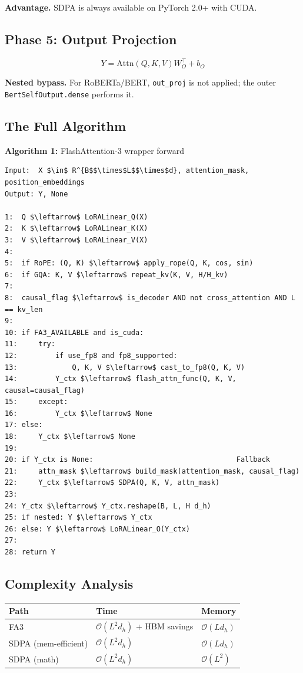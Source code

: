 \textbf{Advantage.} SDPA is always available on PyTorch 2.0+ with CUDA.

\subsection{Phase 5: Output Projection}

\[
Y = \text{Attn}(Q, K, V) W_O^\top + b_O
\tag{4.4}
\]

\textbf{Nested bypass.} For RoBERTa/BERT, \texttt{out\_proj} is not applied; the outer 
\texttt{BertSelfOutput.dense} performs it.

\subsection{The Full Algorithm}

\textbf{Algorithm 1:} FlashAttention-3 wrapper forward
\begin{lstlisting}
Input:  X $\in$ R^{B$$\times$L$$\times$d}, attention_mask, position_embeddings
Output: Y, None

1:  Q $\leftarrow$ LoRALinear_Q(X)
2:  K $\leftarrow$ LoRALinear_K(X)
3:  V $\leftarrow$ LoRALinear_V(X)
4:
5:  if RoPE: (Q, K) $\leftarrow$ apply_rope(Q, K, cos, sin)
6:  if GQA: K, V $\leftarrow$ repeat_kv(K, V, H/H_kv)
7:
8:  causal_flag $\leftarrow$ is_decoder AND not cross_attention AND L == kv_len
9:
10: if FA3_AVAILABLE and is_cuda:
11:     try:
12:         if use_fp8 and fp8_supported:
13:             Q, K, V $\leftarrow$ cast_to_fp8(Q, K, V)
14:         Y_ctx $\leftarrow$ flash_attn_func(Q, K, V, causal=causal_flag)
15:     except:
16:         Y_ctx $\leftarrow$ None
17: else:
18:     Y_ctx $\leftarrow$ None
19:
20: if Y_ctx is None:                                  Fallback
21:     attn_mask $\leftarrow$ build_mask(attention_mask, causal_flag)
22:     Y_ctx $\leftarrow$ SDPA(Q, K, V, attn_mask)
23:
24: Y_ctx $\leftarrow$ Y_ctx.reshape(B, L, H d_h)
25: if nested: Y $\leftarrow$ Y_ctx
26: else: Y $\leftarrow$ LoRALinear_O(Y_ctx)
27:
28: return Y
\end{lstlisting}

\subsection{Complexity Analysis}

\begin{table}[H]
\centering
\small
\begin{tabular}{lll}
\toprule
\textbf{Path} & \textbf{Time} & \textbf{Memory} \\
\midrule
FA3 & $\mathcal{O}(L^2 d_h)$ + HBM savings & $\mathcal{O}(L d_h)$ \\
SDPA (mem-efficient) & $\mathcal{O}(L^2 d_h)$ & $\mathcal{O}(L d_h)$ \\
SDPA (math) & $\mathcal{O}(L^2 d_h)$ & $\mathcal{O}(L^2)$ \\
\bottomrule
\end{tabular}
\end{table}

